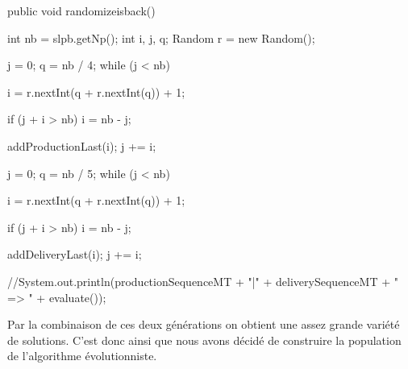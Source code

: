 \begin{java}
public void randomizeisback() {
	int nb = slpb.getNp();
	int i, j, q;
	Random r = new Random();
	
	j = 0;
	q = nb / 4;
	while (j < nb) {
		i = r.nextInt(q + r.nextInt(q)) + 1;
		
		if (j + i > nb) {
			i = nb - j;
		}
		
		addProductionLast(i);
		j += i;
	}
	
	j = 0;
	q = nb / 5;
	while (j < nb) {
		i = r.nextInt(q + r.nextInt(q)) + 1;
		
		if (j + i > nb) {
			i = nb - j;
		}
		
		addDeliveryLast(i);
		j += i;
	}
	
	//System.out.println(productionSequenceMT + "|" + deliverySequenceMT + " => " + evaluate());
}

\end{java}
\vspace{1em}
Par la combinaison de ces deux générations on obtient une assez grande variété de solutions. C'est donc ainsi que nous avons décidé de construire la population de l'algorithme évolutionniste.